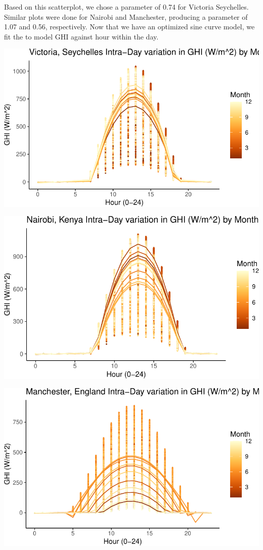 \documentclass[
  letterpaper,
  DIV=11,
  numbers=noendperiod]{scrartcl}
\begin{document}
Based on this scatterplot, we chose a parameter of 0.74 for Victoria
Seychelles. Similar plots were done for Nairobi and Manchester,
producing a parameter of 1.07 and 0.56, respectively. Now that we have
an optimized sine curve model, we fit the to model GHI against hour
within the day.

\includegraphics{FinalReport_files/figure-pdf/unnamed-chunk-3-1.pdf}

\includegraphics{FinalReport_files/figure-pdf/unnamed-chunk-4-1.pdf}

\includegraphics{FinalReport_files/figure-pdf/unnamed-chunk-5-1.pdf}
\end{document}
